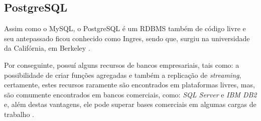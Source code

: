 \subsection{PostgreSQL}

Assim como o \acs{MySQL}, o \acs{PostgreSQL} é um \acs{RDBMS} também de
código livre e seu antepassado ficou conhecido como Ingres, sendo que, surgiu na
universidade da Califórnia, em Berkeley
\cite{postgreSQLIntroductionAndConcepts}.

Por conseguinte, possuí alguns recursos de bancos empresariais, tais como: a
possibilidade de criar funções agregadas e também a replicação de
\textit{streaming},  certamente, estes recursos raramente são encontrados em 
plataformas livres, mas, são comumente encontrados em bancos comerciais, como:
\textit{SQL Server} e \textit{IBM DB2} e, além destas vantagens, ele pode 
superar bases comerciais  em algumas cargas de trabalho 
\cite{postgreSQLUpAndRunning}.
